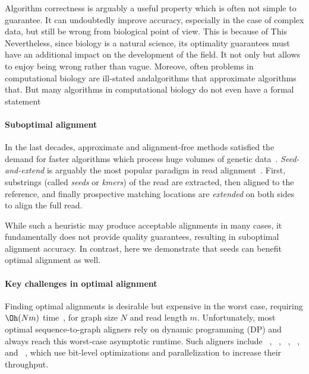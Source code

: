 Algorithm correctness is arguably a useful property which is often not simple to
guarantee. It can undoubtedly improve accuracy, especially in the case of
complex data, but still be wrong from biological point of view. This is because
of  This Nevertheless, since biology is a natural science, its  optimality
guarantees must have an additional impact on the development of the field. It
not only but allows to enjoy being wrong rather than vague. Moreove, often
problems in computational biology are ill-stated andalgorithms that approximate
algorithms that. But many algorithms in computational biology do not even have a
formal statement 

\paragraph{Suboptimal alignment}
%
In the last decades, approximate and alignment-free methods satisfied the demand
for faster algorithms which process huge volumes of genetic
data~\citep{kucherov2019evolution}. 
%
\emph{Seed-and-extend} is arguably the most popular paradigm in read
alignment~\citep{altschul_basic_1990,langmead_fast_2012,li_fast_2009}. First,
substrings (called \emph{seeds} or \emph{kmers}) of the read are extracted, then
aligned to the reference, and finally prospective matching locations are
\emph{extended} on both sides to align the full read.

While such a heuristic may produce acceptable alignments in many cases, it
fundamentally does not provide quality guarantees, resulting in suboptimal
alignment accuracy.
%
In contrast, here we demonstrate that seeds can benefit optimal alignment as
well.

\paragraph{Key challenges in optimal alignment}
%
Finding optimal alignments is desirable but expensive in the worst case,
requiring $\Oh(Nm)$ time~\citep{equi2019complexity}, for graph size $N$ and read
length $m$.
%
Unfortunately, most optimal sequence-to-graph aligners rely on dynamic
programming (DP) and always reach this worst-case asymptotic runtime. Such
aligners include \vargas~\citep{darby2020vargas},
\pasgal~\citep{jain_accelerating_2019},
\graphaligner~\citep{rautiainen_bitparallel_2019},
\hga~\citep{feng2021accelerating}, and \vg~\citep{garrison_variation_2018},
which use bit-level optimizations and parallelization to increase their
throughput.

